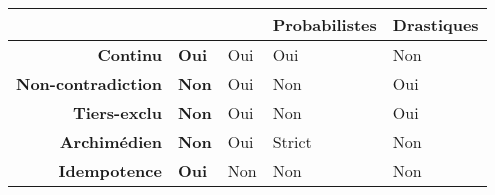 \begin{tabular}{r>{\small}C{.15\textwidth}>{\small}C{.15\textwidth}>{\small}C{.15\textwidth}>{\small}C{.15\textwidth}}
  \toprule
  & \bfseries \textcite{Zadeh1965}&\bfseries {}&\bfseries
                                                   Probabilistes &\bfseries Drastiques\\
  \midrule
  \bfseries Continu & \bfseries Oui & Oui & Oui & Non \\
  \bfseries Non-contradiction & \bfseries Non & Oui & Non & Oui \\
  \bfseries Tiers-exclu & \bfseries Non & Oui & Non & Oui \\
  \bfseries Archimédien & \bfseries Non & Oui & Strict & Non \\
  \bfseries Idempotence & \bfseries Oui & Non & Non & Non \\
  \bottomrule
\end{tabular}
